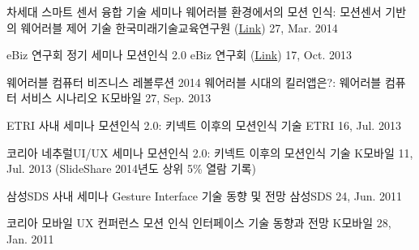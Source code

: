 


\begin{cventries}

  \cventry
    {차세대 스마트 센서 융합 기술 세미나} %
    {웨어러블 환경에서의 모션 인식: 모션센서 기반의 웨어러블 제어 기술} %
    {한국미래기술교육연구원 (\href{http://nvyt.kecft.or.kr/bbs/bbsView.php?id=146&code=bbs_schedule&bbs_id=2}{Link})} %
    {27, Mar. 2014} %
    {}

  \cventry
    {eBiz 연구회 정기 세미나} %
    {모션인식 2.0} %
    {eBiz 연구회 (\href{http://www.dure.net/SIG.html}{Link})} %
    {17, Oct. 2013} %
    {}

  \cventry
    {웨어러블 컴퓨터 비즈니스 레볼루션 2014} %
    {웨어러블 시대의 킬러앱은?: 웨어러블 컴퓨터 서비스 시나리오} %
    {K모바일} %
    {27, Sep. 2013} %
    {}

  \cventry
    {ETRI 사내 세미나} %
    {모션인식 2.0: 키넥트 이후의 모션인식 기술} %
    {ETRI} %
    {16, Jul. 2013} %
    {}

  \cventry
    {코리아 네추럴UI/UX 세미나} %
    {모션인식 2.0: 키넥트 이후의 모션인식 기술} %
    {K모바일} %
    {11, Jul. 2013} %
    {(SlideShare 2014년도 상위 5\% 열람 기록)}

  \cventry
    {삼성SDS 사내 세미나} %
    {Gesture Interface 기술 동향 및 전망} %
    {삼성SDS} %
    {24, Jun. 2011} %
    {}
    
  \cventry
    {코리아 모바일 UX 컨퍼런스} %
    {모션 인식 인터페이스 기술 동향과 전망} %
    {K모바일} %
    {28, Jan. 2011} %
    {}
\end{cventries}
